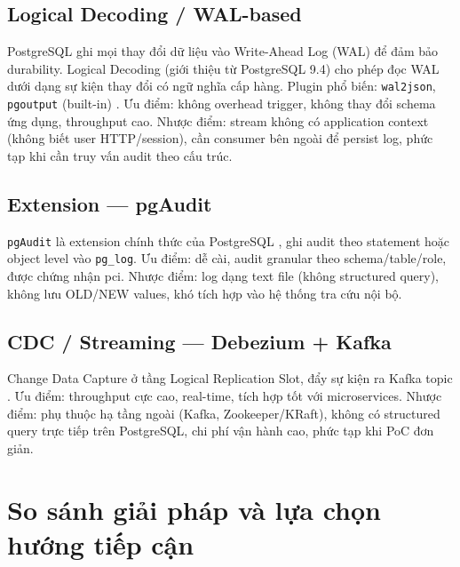 \subsection{Logical Decoding / WAL-based}

PostgreSQL ghi mọi thay đổi dữ liệu vào Write-Ahead Log (WAL) để đảm bảo durability. Logical Decoding (giới thiệu từ PostgreSQL 9.4) cho phép đọc WAL dưới dạng sự kiện thay đổi có ngữ nghĩa cấp hàng. Plugin phổ biến: \texttt{wal2json}, \texttt{pgoutput} (built-in) \cite{PG16Triggers}. Ưu điểm: không overhead trigger, không thay đổi schema ứng dụng, throughput cao. Nhược điểm: stream không có application context (không biết user HTTP/session), cần consumer bên ngoài để persist log, phức tạp khi cần truy vấn audit theo cấu trúc.

\subsection{Extension --- pgAudit}

\texttt{pgAudit} là extension chính thức của PostgreSQL \cite{pgAudit}, ghi audit theo statement hoặc object level vào \texttt{pg\_log}. Ưu điểm: dễ cài, audit granular theo schema/table/role, được chứng nhận \ac{pci}. Nhược điểm: log dạng text file (không structured query), không lưu OLD/NEW values, khó tích hợp vào hệ thống tra cứu nội bộ.

\subsection{CDC / Streaming --- Debezium + Kafka}

Change Data Capture ở tầng Logical Replication Slot, đẩy sự kiện ra Kafka topic \cite{Debezium}. Ưu điểm: throughput cực cao, real-time, tích hợp tốt với microservices. Nhược điểm: phụ thuộc hạ tầng ngoài (Kafka, Zookeeper/KRaft), không có structured query trực tiếp trên PostgreSQL, chi phí vận hành cao, phức tạp khi PoC đơn giản.

\section{So sánh giải pháp và lựa chọn hướng tiếp cận}

